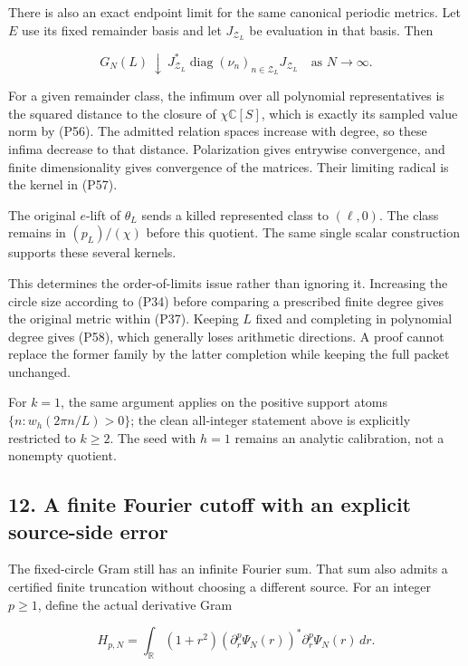 There is also an exact endpoint limit for the same canonical periodic metrics. Let \(E\) use its fixed remainder basis and let \(J_{\mathcal Z_L}\) be evaluation in that basis. Then

\[
\boxed{
G_N(L)\ \downarrow\
J_{\mathcal Z_L}^*\operatorname{diag}(\nu_n)_{n\in\mathcal Z_L}
J_{\mathcal Z_L}
\quad\text{as }N\to\infty.}
\tag{P58}
\]

For a given remainder class, the infimum over all polynomial representatives is the squared distance to the closure of \(\chi\mathbb C[S]\), which is exactly its sampled value norm by (P56). The admitted relation spaces increase with degree, so these infima decrease to that distance. Polarization gives entrywise convergence, and finite dimensionality gives convergence of the matrices. Their limiting radical is the kernel in (P57).

The original \(e\)-lift of \(\theta_L\) sends a killed represented class to \((\ell,0)\). The class remains in \((p_L)/(\chi)\) before this quotient. The same single scalar construction supports these several kernels.

This determines the order-of-limits issue rather than ignoring it. Increasing the circle size according to (P34) before comparing a prescribed finite degree gives the original metric within (P37). Keeping \(L\) fixed and completing in polynomial degree gives (P58), which generally loses arithmetic directions. A proof cannot replace the former family by the latter completion while keeping the full packet unchanged.

For \(k=1\), the same argument applies on the positive support atoms \(\{n:w_h(2\pi n/L)>0\}\); the clean all-integer statement above is explicitly restricted to \(k\ge2\). The seed with \(h=1\) remains an analytic calibration, not a nonempty quotient.

\subsection{12. A finite Fourier cutoff with an explicit source-side error}\label{endpoint-periodized_original--a-finite-fourier-cutoff-with-an-explicit-source-side-error}

The fixed-circle Gram still has an infinite Fourier sum. That sum also admits a certified finite truncation without choosing a different source. For an integer \(p\ge1\), define the actual derivative Gram

\[
H_{p,N}=\int_{\mathbb R}(1+r^2)
(\partial_r^p\Psi_N(r))^*\partial_r^p\Psi_N(r)\,dr.
\tag{P59}
\]

